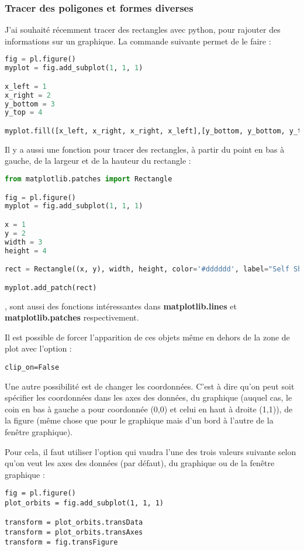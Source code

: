 \documentclass[a4paper,twoside]{article}
\begin{document}
\subsubsection{Tracer des poligones et formes diverses}
J'ai souhaité récemment tracer des rectangles avec python, pour rajouter des informations sur un graphique. La commande suivante permet de le faire :
\begin{lstlisting}[language=python]
fig = pl.figure()
myplot = fig.add_subplot(1, 1, 1)

x_left = 1
x_right = 2
y_bottom = 3
y_top = 4

myplot.fill([x_left, x_right, x_right, x_left],[y_bottom, y_bottom, y_top, y_top], fill=False, hatch='\\')
\end{lstlisting}

Il y a aussi une fonction pour tracer des rectangles, à partir du point en bas à gauche, de la largeur et de la hauteur du rectangle : 
\begin{lstlisting}[language=python]
from matplotlib.patches import Rectangle

fig = pl.figure()
myplot = fig.add_subplot(1, 1, 1)

x = 1
y = 2
width = 3
height = 4

rect = Rectangle((x, y), width, height, color='#dddddd', label="Self Shadowing")

myplot.add_patch(rect)
\end{lstlisting}

\bigskip

,  sont aussi des fonctions intéressantes dans \textbf{matplotlib.lines} et \textbf{matplotlib.patches}
respectivement. 

Il est possible de forcer l'apparition de ces objets même en dehors de la zone de plot avec l'option : 
\begin{verbatim}
clip_on=False
\end{verbatim}

\bigskip

Une autre possibilité est de changer les coordonnées. C'est à dire qu'on peut soit spécifier les coordonnées dans les axes des
données, du graphique (auquel cas, le coin en bas à gauche a pour coordonnée (0,0) et celui en haut à droite (1,1)), de la
figure (même chose que pour le graphique mais d'un bord à l'autre de la fenêtre graphique).

Pour cela, il faut utiliser l'option  qui vaudra l'une des trois valeurs suivante selon qu'on veut les axes des
données (par défaut), du graphique ou de la fenêtre graphique : 
\begin{verbatim}
fig = pl.figure()
plot_orbits = fig.add_subplot(1, 1, 1)

transform = plot_orbits.transData
transform = plot_orbits.transAxes
transform = fig.transFigure
\end{verbatim}
\end{document}
